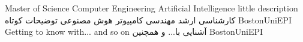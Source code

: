 
\educationGradeCI
{Master of Science}
{Computer Engineering}
{Artificial Intelligence}
{little description}
{کارشناسی ارشد}
{مهندسی کامپیوتر}
{هوش مصنوعی}
{توضیحات کوتاه}
{BostonUniEPI}
\educationGradeCII
{Getting to know with... and so on}
{آشنایی با... و همچنین}
{\fulltime}
{}
{}
{}
{BostonUniEPI}
